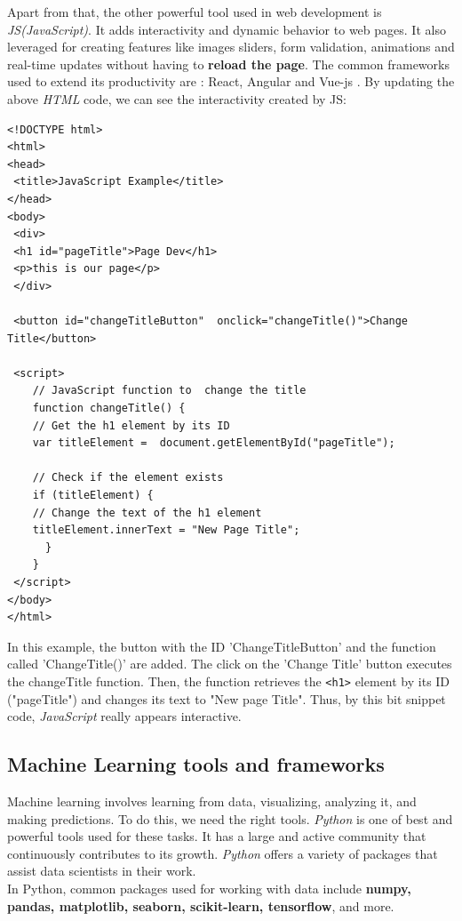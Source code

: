 \documentclass[12pt,a4paper, oneside]{book}
\begin{document}
Apart from that, the other powerful tool used in web development is \textit{JS(JavaScript)}. It adds interactivity and dynamic behavior to web pages. It also leveraged for creating features like images sliders, form validation, animations and real-time updates without having to \textbf{reload the page}. The common frameworks used to extend its productivity are : React, Angular and Vue-js \cite{wohlgethan2018supportingweb}. By updating the above \textit{HTML} code, we can see the interactivity created by JS: 
\begin{lstlisting}[style=htmlcssjsstyle, label=lst:jsCode]
<!DOCTYPE html>
<html>
<head>
 <title>JavaScript Example</title>
</head>
<body>
 <div>
 <h1 id="pageTitle">Page Dev</h1>
 <p>this is our page</p>
 </div>
	
 <button id="changeTitleButton"  onclick="changeTitle()">Change  Title</button>
	
 <script>
 	// JavaScript function to  change the title
 	function changeTitle() {
 	// Get the h1 element by its ID
 	var titleElement =  document.getElementById("pageTitle");
	
 	// Check if the element exists
 	if (titleElement) {
	// Change the text of the h1 element
 	titleElement.innerText = "New Page Title";
	  }
	}
 </script>
</body>
</html>	
\end{lstlisting} 

In this example, the button with the ID 'ChangeTitleButton' and the function called 'ChangeTitle()' are added. The click on the 'Change Title' button executes the changeTitle function. Then, the function retrieves the \texttt{<h1>} element by its
ID ("pageTitle") and changes its text to "New page Title". Thus, by this bit snippet code, \textit{JavaScript} really appears interactive.

\subsection{\large Machine Learning tools and frameworks} 
Machine learning involves learning from data, visualizing, analyzing it, and making predictions. To do this, we need the right tools. \textit{Python} is one of best and powerful tools used for these tasks. It has a large and active community that continuously contributes to its growth. \textit{Python} offers a variety of packages that assist data scientists in their work.\\

In Python, common packages used for working with data include\textbf{ numpy, pandas, matplotlib, seaborn, scikit-learn, tensorflow}, and more.
\end{document}
